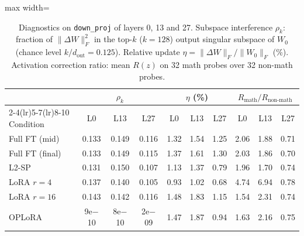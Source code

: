 \begin{table}[htbp]
\centering
\small
\caption{Diagnostics on \texttt{down\_proj} of layers 0, 13 and 27. Subspace interference $\rho_k$: fraction of $\|\Delta W\|_F^2$ in the top-$k$ ($k{=}128$) output singular subspace of $W_0$ (chance level $k/d_\text{out}=0.125$). Relative update $\eta=\|\Delta W\|_F/\|W_0\|_F$ (\%). Activation correction ratio: mean $R(z)$ on 32 math probes over 32 non-math probes.}
\label{tab:t1-diagnostics}
\begin{adjustbox}{max width=\linewidth}
\begin{tabular}{lccccccccc}
\toprule
 & \multicolumn{3}{c}{$\rho_k$} & \multicolumn{3}{c}{$\eta$ (\%)} & \multicolumn{3}{c}{$R_\text{math}/R_\text{non-math}$} \\
\cmidrule(lr){2-4}\cmidrule(lr){5-7}\cmidrule(lr){8-10}
Condition & L0 & L13 & L27 & L0 & L13 & L27 & L0 & L13 & L27 \\
\midrule
Full FT (mid) & 0.133 & 0.149 & 0.116 & 1.32 & 1.54 & 1.25 & 2.06 & 1.88 & 0.71 \\
Full FT (final) & 0.133 & 0.149 & 0.115 & 1.37 & 1.61 & 1.30 & 2.03 & 1.86 & 0.70 \\
L2-SP & 0.131 & 0.150 & 0.107 & 1.13 & 1.37 & 0.79 & 1.96 & 1.70 & 0.74 \\
LoRA $r{=}4$ & 0.137 & 0.140 & 0.105 & 0.93 & 1.02 & 0.68 & 4.74 & 6.94 & 0.78 \\
LoRA $r{=}16$ & 0.143 & 0.142 & 0.116 & 1.48 & 1.83 & 1.15 & 1.54 & 2.31 & 0.74 \\
OPLoRA & 9e$-$10 & 8e$-$10 & 2e$-$09 & 1.47 & 1.87 & 0.94 & 1.63 & 2.16 & 0.75 \\
\bottomrule
\end{tabular}
\end{adjustbox}
\end{table}
